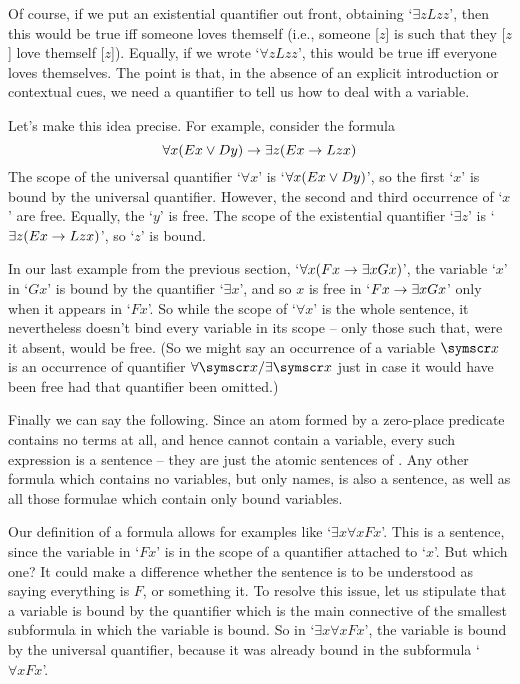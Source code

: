 Of course, if we put an existential quantifier out front, obtaining `$\exists zLzz$', then this would be true iff someone loves themself (i.e., someone [$z$] is such that they [$z$] love themself [$z$]). Equally, if we wrote `$\forall z Lzz$', this would be true iff everyone loves themselves. The point is that, in the absence of an explicit introduction or contextual cues, we need a quantifier to tell us how to deal with a variable. 

Let's make this idea precise.
For example, consider the formula
	$$\forall x(Ex \vee Dy) \rightarrow \exists z(Ex \rightarrow Lzx)$$
The scope of the universal quantifier `$\forall x$' is `$\forall x (Ex \vee Dy)$', so the first `$x$' is bound by the universal quantifier. However, the second and third occurrence of `$x$' are free. Equally, the `$y$' is free. The scope of the existential quantifier `$\exists z$' is `$\exists z(Ex \rightarrow Lzx)$', so `$z$' is bound. 

In our last example from the previous section, `$\forall x (Fx \rightarrow \exists xGx)$', the variable `$x$' in `$Gx$' is bound by the quantifier `$\exists x$', and so $x$ is free in `$Fx \rightarrow \exists x Gx$' only when it appears in `$Fx$'. So while the scope of `$\forall x$' is the whole sentence, it nevertheless doesn't bind every variable in its scope – only those such that, were it absent, would be free. (So we might say an occurrence of a variable $\meta{x}$ is  an occurrence of quantifier $\forall \meta{x}/\exists \meta{x}$ just in case it would have been free had that quantifier been omitted.) 


Finally we can say the following.	
Since an atom formed by a zero-place predicate contains no terms at all, and hence cannot contain a variable, every such expression is a sentence – they are just the atomic sentences of \TFL. Any other formula which contains no variables, but only names, is also a sentence, as well as all those formulae which contain only bound variables. 

Our definition of a formula allows for examples like `$\exists x \forall x Fx$'. This is a sentence, since the variable in `$Fx$' is in the scope of a quantifier attached to `$x$'. But which one? It could make a difference whether the sentence is to be understood as saying everything is $F$, or something it. To resolve this issue, let us stipulate that a variable is bound by the quantifier which is the main connective of the smallest subformula in which the variable is bound. So in `$\exists x \forall x Fx$', the variable is bound by the universal quantifier, because it was already bound in the subformula `$\forall x Fx$'.


